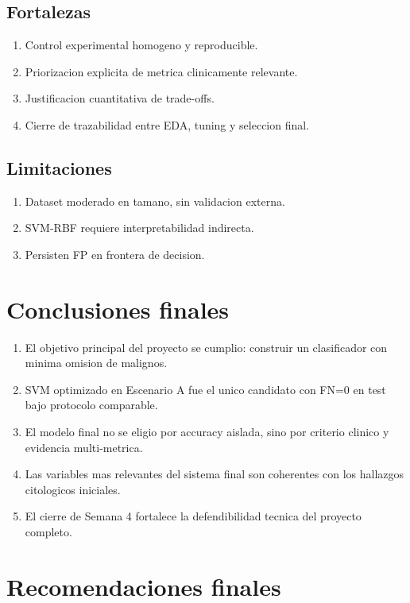 \documentclass[11pt,a4paper]{article}
\begin{document}
\subsection{Fortalezas}

\begin{enumerate}[leftmargin=1.2cm]
\item Control experimental homogeno y reproducible.
\item Priorizacion explicita de metrica clinicamente relevante.
\item Justificacion cuantitativa de trade-offs.
\item Cierre de trazabilidad entre EDA, tuning y seleccion final.
\end{enumerate}

\subsection{Limitaciones}

\begin{enumerate}[leftmargin=1.2cm]
\item Dataset moderado en tamano, sin validacion externa.
\item SVM-RBF requiere interpretabilidad indirecta.
\item Persisten FP en frontera de decision.
\end{enumerate}

\section{Conclusiones finales}

\begin{enumerate}[leftmargin=1.2cm]
\item El objetivo principal del proyecto se cumplio: construir un clasificador con minima omision de malignos.
\item SVM optimizado en Escenario A fue el unico candidato con FN=0 en test bajo protocolo comparable.
\item El modelo final no se eligio por accuracy aislada, sino por criterio clinico y evidencia multi-metrica.
\item Las variables mas relevantes del sistema final son coherentes con los hallazgos citologicos iniciales.
\item El cierre de Semana 4 fortalece la defendibilidad tecnica del proyecto completo.
\end{enumerate}

\section{Recomendaciones finales}
\end{document}
